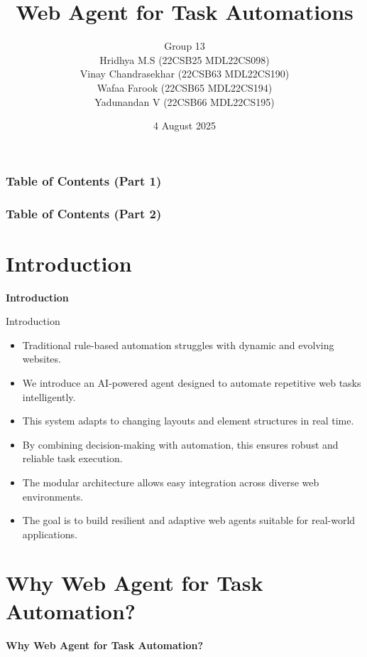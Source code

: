 \documentclass{beamer}
\title{Web Agent for Task Automations}
\author{
Group 13\\
Hridhya M.S (22CSB25 MDL22CS098)\\
Vinay Chandrasekhar (22CSB63 MDL22CS190)\\
Wafaa Farook (22CSB65 MDL22CS194)\\
Yadunandan V (22CSB66 MDL22CS195)\\
}
\institute{Model Engineering College}
\date{4 August 2025}
\begin{document}
\begin{frame}
\titlepage
\end{frame}

\begin{frame}
\frametitle{Table of Contents (Part 1)}
\tableofcontents[sections=1-9] %
\end{frame}

\begin{frame}
\frametitle{Table of Contents (Part 2)}
\tableofcontents[sections=10-13] %
\end{frame}
\section{Introduction}

\begin{frame}
\centering
\Huge \textbf{Introduction}
\end{frame}

\begin{frame}{Introduction}
\normalsize
\begin{itemize}
  \item Traditional rule-based automation struggles with dynamic and evolving websites.
  \item We introduce an AI-powered agent designed to automate repetitive web tasks intelligently.
  \item This system adapts to changing layouts and element structures in real time.
  \item By combining decision-making with automation, this ensures robust and reliable task execution.
  \item The modular architecture allows easy integration across diverse web environments.
  \item The goal is to build resilient and adaptive web agents suitable for real-world applications.
\end{itemize}
\end{frame}




\section{Why Web Agent for Task Automation?}

\begin{frame}
\centering
\Huge \textbf{Why Web Agent for Task Automation?}
\end{frame}
\end{document}
